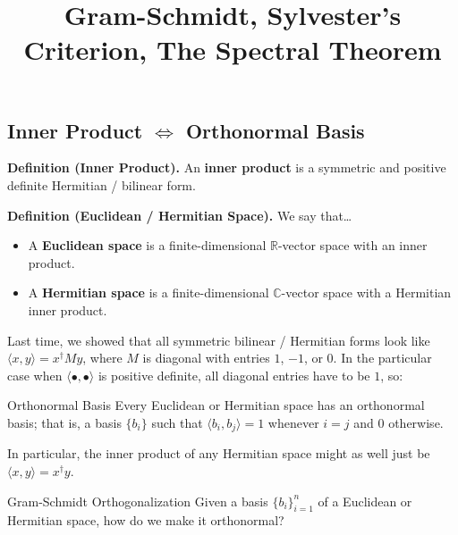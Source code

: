 \title{Gram-Schmidt, Sylvester's Criterion, The Spectral Theorem}



\subsection{Inner Product $\iff$ Orthonormal Basis}

\textbf{Definition (Inner Product).} An \textbf{inner product} is a symmetric and positive definite Hermitian / bilinear form.

\textbf{Definition (Euclidean / Hermitian Space).} We say that\dots
\begin{itemize}
    \item A \textbf{Euclidean space} is a finite-dimensional $\mathbb{R}$-vector space with an inner product.
    \item A \textbf{Hermitian space} is a finite-dimensional $\mathbb{C}$-vector space with a Hermitian inner product.
\end{itemize}

Last time, we showed that all symmetric bilinear / Hermitian forms look like $\langle x, y \rangle = x^{\dagger} My$, where $M$ is diagonal with entries $1$, $-1$, or $0$.  In the particular case when $\langle \bullet, \bullet \rangle$ is positive definite, all diagonal entries have to be $1$, so:

\begin{theorem}{Orthonormal Basis}
    Every Euclidean or Hermitian space has an orthonormal basis; that is, a basis $\{b_i\}$ such that $\langle b_i, b_j \rangle = 1$ whenever $i = j$ and $0$ otherwise.
\end{theorem}

In particular, the inner product of any Hermitian space might as well just be $\langle x, y \rangle = x^{\dagger}y$.

\begin{problem}{Gram-Schmidt Orthogonalization}
    Given a basis $\{b_i\}_{i = 1}^n$ of a Euclidean or Hermitian space, how do we make it orthonormal?
\end{problem}

